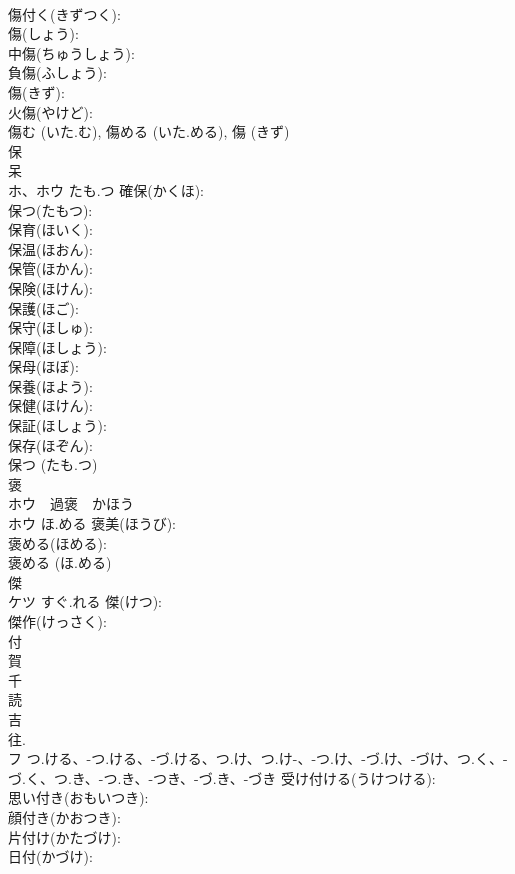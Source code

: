 \documentclass[8pt]{extreport}
\begin{document}
\begin{CJK}{UTF8}{min}
\\	傷付く(きずつく): 
\\	傷(しょう): 
\\	中傷(ちゅうしょう): 
\\	負傷(ふしょう): 
\\	傷(きず): 
\\	火傷(やけど): 
\\	傷む (いた.む), 傷める (いた.める), 傷 (きず)
\\	保			
\\	呆 
\\	ホ、ホウ	たも.つ	確保(かくほ): 
\\	保つ(たもつ): 
\\	保育(ほいく): 
\\	保温(ほおん): 
\\	保管(ほかん): 
\\	保険(ほけん): 
\\	保護(ほご): 
\\	保守(ほしゅ): 
\\	保障(ほしょう): 
\\	保母(ほぼ): 
\\	保養(ほよう): 
\\	保健(ほけん): 
\\	保証(ほしょう): 
\\	保存(ほぞん): 
\\	保つ (たも.つ)
\\	褒			
\\	ホウ　過褒　かほう
\\	ホウ	ほ.める	褒美(ほうび): 
\\	褒める(ほめる): 
\\	褒める (ほ.める)
\\	傑			
\\	ケツ	すぐ.れる	傑(けつ): 
\\	傑作(けっさく): 
\\	付			
\\	賀 
\\	千 
\\	読
\\	吉 
\\	往. 
\\	フ	つ.ける、-つ.ける、-づ.ける、つ.け、つ.け-、-つ.け、-づ.け、-づけ、つ.く、-づ.く、つ.き、-つ.き、-つき、-づ.き、-づき	受け付ける(うけつける): 
\\	思い付き(おもいつき): 
\\	顔付き(かおつき): 
\\	片付け(かたづけ): 
\\	日付(かづけ): 

\end{CJK}
\end{document}
